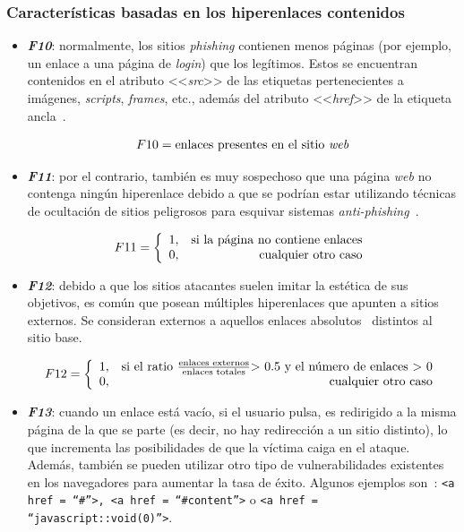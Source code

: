 \subsubsection{Características basadas en los hiperenlaces contenidos}

\begin{itemize}
	\item \textit{\textbf{F10}}: normalmente, los sitios \textit{phishing} contienen menos páginas (por ejemplo, un enlace a una página de \textit{login}) que los legítimos. Estos se encuentran contenidos en el atributo <<\textit{src}>> de las etiquetas pertenecientes a imágenes, \textit{scripts}, \textit{frames}, etc., además del atributo <<\textit{href}>> de la etiqueta ancla~\cite{anclaMozilla}.
	
	\begin{equation}\label{eqn:phishing_f10} F10 = \text{enlaces presentes en el sitio \textit{web}} \end{equation}
	
	\item \textit{\textbf{F11}}: por el contrario, también es muy sospechoso que una página \textit{web} no contenga ningún hiperenlace debido a que se podrían estar utilizando técnicas de ocultación de sitios peligrosos para esquivar sistemas \textit{anti-phishing}~\cite{hiperlinkHidingTechniques}.
	
	\[F11 = \left\{ \begin{array}{lr} 1, & \text{si la página no contiene enlaces}\\ 
		0, & \text{\raggedright cualquier otro caso} \label{eqn:phishing_f11} \end{array}\right.\]
	
	\item \textit{\textbf{F12}}: debido a que los sitios atacantes suelen imitar la estética de sus objetivos, es común que posean múltiples hiperenlaces que apunten a sitios externos. Se consideran externos a aquellos enlaces absolutos~\cite{enlacesAbsRel} distintos al sitio base.
	
	\[F12 = \left\{ \begin{array}{lr} 1, & \text{si el ratio } \frac{\text{enlaces externos}}{\text{enlaces totales}} \text{> 0.5 y el número de enlaces > 0} \\
		0, & \text{\raggedright cualquier otro caso} \label{eqn:phishing_f12} \end{array}\right.\]
	
	
	\item \textit{\textbf{F13}}: cuando un enlace está vacío, si el usuario pulsa, es redirigido a la misma página de la que se parte (es decir, no hay redirección a un sitio distinto), lo que incrementa las posibilidades de que la víctima caiga en el ataque. Además, también se pueden utilizar otro tipo de vulnerabilidades existentes en los navegadores para aumentar la tasa de éxito. Algunos ejemplos son~\cite{featuresPhishing2018Gupta}: \texttt{<a href = “\#”>, <a href = “\#content”>} o \texttt{<a href = “javascript::void(0)”>}.
	

\end{itemize}
